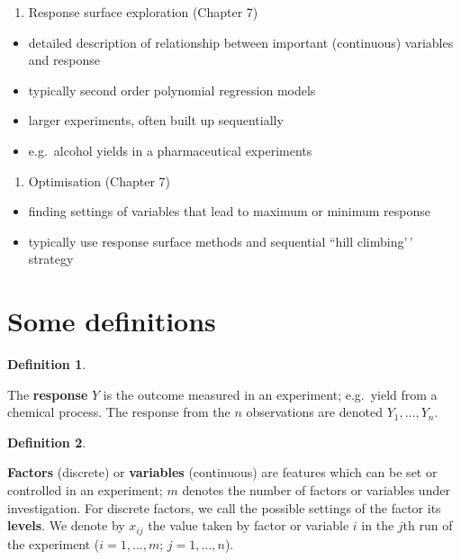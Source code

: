 \documentclass[
]{book}
\providecommand{\tightlist}{%
  \setlength{\itemsep}{0pt}\setlength{\parskip}{0pt}}
\theoremstyle{definition}
\newtheorem{definition}{Definition}[chapter]
\theoremstyle{definition}
\theoremstyle{definition}
\theoremstyle{definition}
\theoremstyle{remark}
\begin{document}
\begin{enumerate}
\def\labelenumi{\arabic{enumi}.}
\setcounter{enumi}{2}
\tightlist
\item
  Response surface exploration (Chapter 7)
\end{enumerate}

\begin{itemize}
\tightlist
\item
  detailed description of relationship between important (continuous) variables and response
\item
  typically second order polynomial regression models
\item
  larger experiments, often built up sequentially
\item
  e.g.~alcohol yields in a pharmaceutical experiments
\end{itemize}

\begin{enumerate}
\def\labelenumi{\arabic{enumi}.}
\setcounter{enumi}{3}
\tightlist
\item
  Optimisation (Chapter 7)
\end{enumerate}

\begin{itemize}
\tightlist
\item
  finding settings of variables that lead to maximum or minimum response
\item
  typically use response surface methods and sequential ``hill climbing'\,' strategy
\end{itemize}

\hypertarget{some-definitions}{%
\section{Some definitions}\label{some-definitions}}

\begin{definition}
\protect\hypertarget{def:response}{}\label{def:response}

The \textbf{response} \(Y\) is the outcome measured in an experiment; e.g.~yield from a chemical process. The response from the \(n\) observations are denoted \(Y_{1},\dots,Y_{n}\).

\end{definition}

\begin{definition}
\protect\hypertarget{def:factor-variable}{}\label{def:factor-variable}

\textbf{Factors} (discrete) or \textbf{variables} (continuous) are features which can be set or controlled in an experiment; \(m\) denotes the number of factors or variables under investigation. For discrete factors, we call the possible settings of the factor its \textbf{levels}. We denote by \(x_{ij}\) the value taken by factor or variable \(i\) in the \(j\)th run of the experiment (\(i = 1, \ldots, m\); \(j = 1, \ldots, n\)).

\end{definition}
\end{document}
